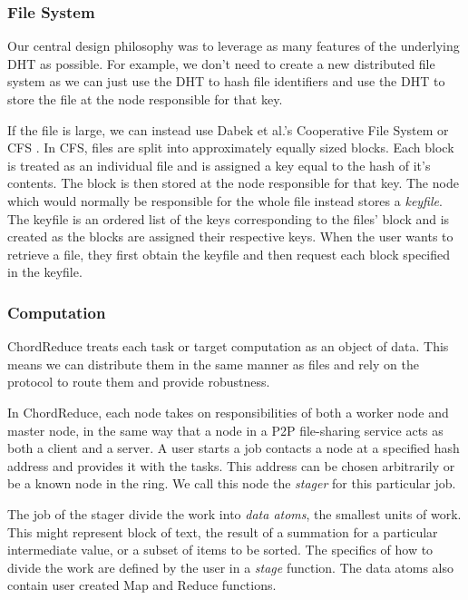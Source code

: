 \subsubsection{File System}
Our central design philosophy was to leverage as many features of the underlying DHT as possible.  
For example, we don't need to create a new distributed file system as we can just use the DHT to hash file identifiers and use the DHT to store the file at the node responsible for that key.

If the file is large, we can instead use Dabek et al.'s Cooperative File System or CFS \cite{CFS}.
In CFS, files are split into approximately equally sized blocks.  
Each block is treated as an individual file and is assigned a key equal to the hash of it's contents.  
The block is then stored at the node responsible for that key. 
The node which would normally be responsible for the whole file instead stores a \textit{keyfile}.  
The keyfile is an ordered list of the keys corresponding to the files' block and is created as the blocks are assigned their respective keys.  
When the user wants to retrieve a file, they first obtain the keyfile and then request each block specified in the keyfile.


\subsubsection{Computation}
ChordReduce treats each task or target computation as an object of data.
This means we can distribute them in the same manner as files and rely on the protocol to route them and provide robustness.


In ChordReduce, each node takes on responsibilities of both a worker node and master node, in the same way that a node in a P2P file-sharing service acts as both a client and a server.  
A user starts a job contacts a node at a specified hash address and provides it with the tasks.  
This address can be chosen arbitrarily or be a known node in the ring. 
We call this node the \textit{stager} for this particular job.  

The job of the stager divide the work into \emph{data atoms}, the smallest units of work. 
This might represent block of text, the result of a summation for a particular intermediate value, or a subset of items to be sorted. 
The specifics of how to divide the work are defined by the user in a \emph{stage} function.  
The data atoms also contain user created Map and Reduce functions.

